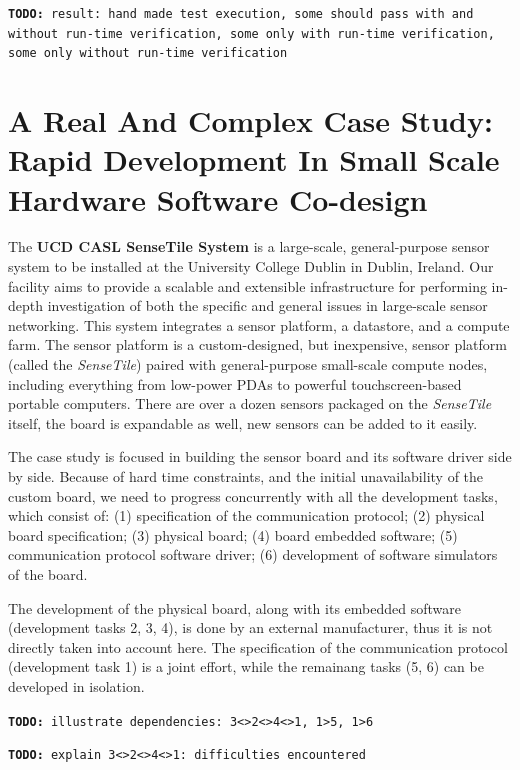 \documentclass{article} \usepackage{times}
\newcommand{\todo}[1]{\texttt{\textbf{TODO:} #1}}
\newcommand{\ST}{\emph{SenseTile}\xspace}
\begin{document}
\todo{result: hand made test execution, some should pass with and without run-time verification, some only with run-time verification, some only without run-time verification}



\section{A Real And Complex Case Study: Rapid Development In Small Scale Hardware Software Co-design}
\label{sec:a_real_and_complex_case_study}

The \textbf{UCD CASL SenseTile System} is a large-scale, general-purpose sensor system to be installed at the University College Dublin in Dublin, Ireland.  
Our facility aims to provide a scalable and extensible infrastructure for performing in-depth investigation of both the specific and general issues in large-scale sensor networking.
This system integrates a sensor platform, a datastore, and a compute farm.  
The sensor platform is a custom-designed, but inexpensive, sensor platform (called the \ST) paired with general-purpose small-scale compute nodes, including everything from low-power PDAs to powerful touchscreen-based portable computers.  
There are over a dozen sensors packaged on the \ST itself, the board is expandable as well, new sensors can be added to it easily.

The case study is focused in building the sensor board and its software driver side by side.
Because of hard time constraints, and the initial unavailability of the custom board, we need to progress concurrently with all the development tasks, which consist of: (1) specification of the communication protocol; (2) physical board specification; (3) physical board; (4) board embedded software; (5) communication protocol software driver; (6) development of software simulators of the board.

The development of the physical board, along with its embedded software (development tasks 2, 3, 4), is done by an external manufacturer, thus it is not directly taken into account here. The specification of the communication protocol (development task 1) is a joint effort, while the remainang tasks (5, 6) can be developed in isolation.

\todo{illustrate dependencies: 3<>2<>4<>1, 1>5, 1>6}

\todo{explain 3<>2<>4<>1: difficulties encountered}
\end{document}
